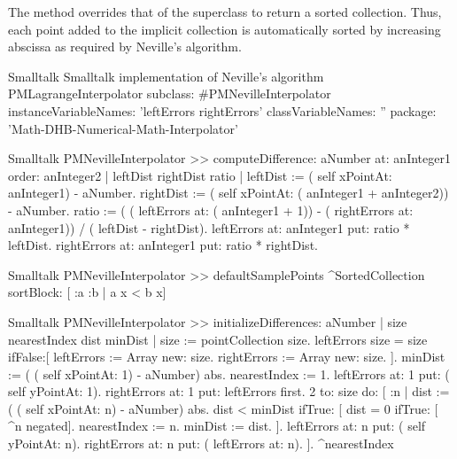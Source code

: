The method  overrides that of the
superclass to return a sorted collection. Thus, each point added
to the implicit collection is automatically sorted by increasing
abscissa as required by Neville's algorithm.

\begin{listing}[label=lst:neville]{Smalltalk}
{Smalltalk implementation of Neville's algorithm}
PMLagrangeInterpolator subclass: #PMNevilleInterpolator
   instanceVariableNames: 'leftErrors rightErrors'
   classVariableNames: ''
   package: 'Math-DHB-Numerical-Math-Interpolator'
\end{listing}

\begin{displaycode}{Smalltalk}
PMNevilleInterpolator >> computeDifference: aNumber at: anInteger1 order: anInteger2
    | leftDist rightDist ratio |
    leftDist := ( self xPointAt: anInteger1) - aNumber.
    rightDist := (  self xPointAt: ( anInteger1 + anInteger2)) - 
                                                              aNumber.
    ratio := ( ( leftErrors at: ( anInteger1 + 1)) - ( rightErrors 
                           at: anInteger1)) / ( leftDist - rightDist).
    leftErrors at: anInteger1 put: ratio * leftDist.
    rightErrors at: anInteger1 put: ratio * rightDist.
\end{displaycode}

\begin{displaycode}{Smalltalk}
PMNevilleInterpolator >> defaultSamplePoints
    ^SortedCollection sortBlock: [ :a :b | a x < b x]
\end{displaycode}

\begin{displaycode}{Smalltalk}
PMNevilleInterpolator >> initializeDifferences: aNumber
    | size nearestIndex dist minDist |
    size := pointCollection size.
    leftErrors size = size
        ifFalse:[ leftErrors := Array new: size.
                  rightErrors := Array new: size.
                ].
    minDist := ( ( self xPointAt: 1) - aNumber) abs.
    nearestIndex := 1.
    leftErrors at: 1 put: ( self yPointAt: 1).
    rightErrors at: 1 put: leftErrors first.
    2 to: size do:
        [ :n |
          dist := ( ( self xPointAt: n) - aNumber) abs.
          dist < minDist
            ifTrue: [ dist = 0
                        ifTrue: [ ^n negated].
                      nearestIndex := n.
                      minDist := dist.
                    ].
         leftErrors at: n put: ( self yPointAt: n).
         rightErrors at: n put: ( leftErrors at: n).
        ].
    ^nearestIndex
\end{displaycode}

